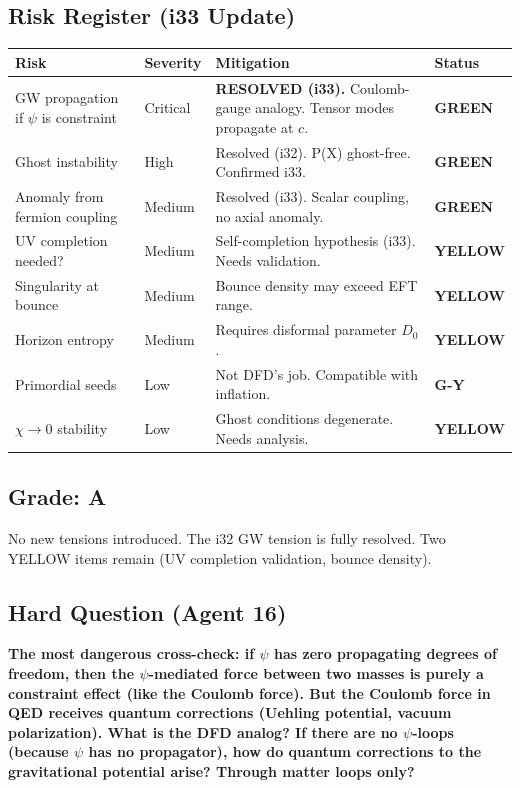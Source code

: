 \documentclass[11pt,a4paper]{article}
\newcommand{\GREEN}{\textcolor{dfdgreen}{\textbf{GREEN}}}
\newcommand{\YELLOW}{\textcolor{dfdyellow}{\textbf{YELLOW}}}
\newcommand{\GY}{\textcolor{dfdgy}{\textbf{G-Y}}}
\begin{document}
\subsection{Risk Register (i33 Update)}

\begin{center}
\begin{longtable}{p{3cm}lp{5cm}l}
\toprule
\textbf{Risk} & \textbf{Severity} & \textbf{Mitigation} & \textbf{Status} \\
\midrule
\endfirsthead
GW propagation if $\psi$ is constraint & Critical & \textbf{RESOLVED (i33).} Coulomb-gauge analogy. Tensor modes propagate at $c$. & \GREEN \\
Ghost instability & High & Resolved (i32). P(X) ghost-free. Confirmed i33. & \GREEN \\
Anomaly from fermion coupling & Medium & Resolved (i33). Scalar coupling, no axial anomaly. & \GREEN \\
UV completion needed? & Medium & Self-completion hypothesis (i33). Needs validation. & \YELLOW \\
Singularity at bounce & Medium & Bounce density may exceed EFT range. & \YELLOW \\
Horizon entropy & Medium & Requires disformal parameter $D_0$. & \YELLOW \\
Primordial seeds & Low & Not DFD's job. Compatible with inflation. & \GY \\
$\chi \to 0$ stability & Low & Ghost conditions degenerate. Needs analysis. & \YELLOW \\
\bottomrule
\end{longtable}
\end{center}

\subsection{Grade: A}

No new tensions introduced. The i32 GW tension is fully resolved. Two YELLOW items remain (UV completion validation, bounce density).

\subsection{Hard Question (Agent 16)}

\textbf{The most dangerous cross-check: if $\psi$ has zero propagating degrees of freedom, then the $\psi$-mediated force between two masses is purely a constraint effect (like the Coulomb force). But the Coulomb force in QED receives quantum corrections (Uehling potential, vacuum polarization). What is the DFD analog? If there are no $\psi$-loops (because $\psi$ has no propagator), how do quantum corrections to the gravitational potential arise? Through matter loops only?}
\end{document}
